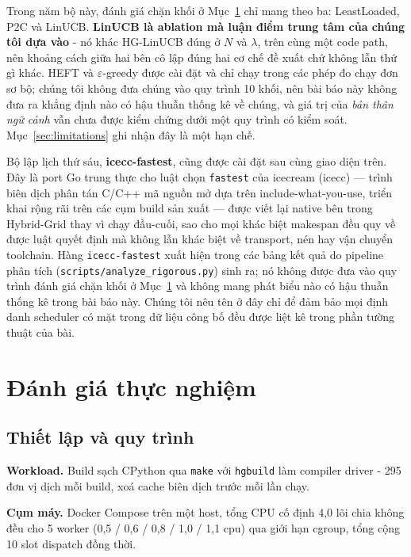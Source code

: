 \documentclass[final,5p,times,twocolumn]{elsarticle}
\begin{document}
Trong năm bộ này, đánh giá chặn khối ở Mục~\ref{sec:eval} chỉ mang theo ba: LeastLoaded, P2C và LinUCB. \textbf{LinUCB là ablation mà luận điểm trung tâm của chúng tôi dựa vào} - nó khác HG-LinUCB đúng ở $N$ và $\lambda$, trên cùng một code path, nên khoảng cách giữa hai bên cô lập đúng hai cơ chế đề xuất chứ không lẫn thứ gì khác. HEFT và $\varepsilon$-greedy được cài đặt và chỉ chạy trong các phép đo chạy đơn sơ bộ; chúng tôi không đưa chúng vào quy trình 10 khối, nên bài báo này không đưa ra khẳng định nào có hậu thuẫn thống kê về chúng, và giá trị của \emph{bản thân ngữ cảnh} vẫn chưa được kiểm chứng dưới một quy trình có kiểm soát. Mục~\ref{sec:limitations} ghi nhận đây là một hạn chế.

Bộ lập lịch thứ sáu, \textbf{icecc-fastest}, cũng được cài đặt sau cùng giao diện trên. Đây là port Go trung thực cho luật chọn \texttt{fastest} của icecream (icecc) --- trình biên dịch phân tán C/C++ mã nguồn mở dựa trên include-what-you-use, triển khai rộng rãi trên các cụm build sản xuất --- được viết lại native bên trong Hybrid-Grid thay vì chạy đầu-cuối, sao cho mọi khác biệt makespan đều quy về được luật quyết định mà không lẫn khác biệt về transport, nén hay vận chuyển toolchain. Hàng \texttt{icecc-fastest} xuất hiện trong các bảng kết quả do pipeline phân tích (\texttt{scripts/analyze\_rigorous.py}) sinh ra; nó không được đưa vào quy trình đánh giá chặn khối ở Mục~\ref{sec:eval} và không mang phát biểu nào có hậu thuẫn thống kê trong bài báo này. Chúng tôi nêu tên ở đây chỉ để đảm bảo mọi định danh scheduler có mặt trong dữ liệu công bố đều được liệt kê trong phần tường thuật của bài.

\section{Đánh giá thực nghiệm}
\label{sec:eval}

\subsection{Thiết lập và quy trình}
\label{sec:setup}

\textbf{Workload.} Build sạch CPython qua \texttt{make} với \texttt{hgbuild} làm compiler driver - 295 đơn vị dịch mỗi build, xoá cache biên dịch trước mỗi lần chạy.

\textbf{Cụm máy.} Docker Compose trên một host, tổng CPU cố định 4,0 lõi chia không đều cho 5 worker (0,5 / 0,6 / 0,8 / 1,0 / 1,1 cpu) qua giới hạn cgroup, tổng cộng 10 slot dispatch đồng thời.
\end{document}
